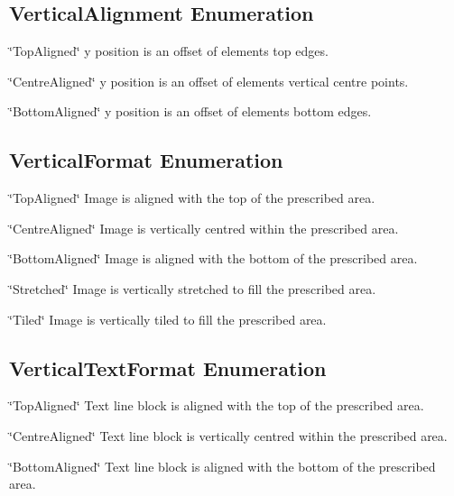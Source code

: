 \hypertarget{fal_enum_ref_fal_enum_ref_sec_9}{}\subsection{Vertical\+Alignment Enumeration}\label{fal_enum_ref_fal_enum_ref_sec_9}
\begin{DoxyItemize}
\item {\ttfamily \char`\"{}\+Top\+Aligned\char`\"{}} y position is an offset of element\textquotesingle{}s top edges. \item {\ttfamily \char`\"{}\+Centre\+Aligned\char`\"{}} y position is an offset of element\textquotesingle{}s vertical centre points. \item {\ttfamily \char`\"{}\+Bottom\+Aligned\char`\"{}} y position is an offset of element\textquotesingle{}s bottom edges.\end{DoxyItemize}
\hypertarget{fal_enum_ref_fal_enum_ref_sec_10}{}\subsection{Vertical\+Format Enumeration}\label{fal_enum_ref_fal_enum_ref_sec_10}
\begin{DoxyItemize}
\item {\ttfamily \char`\"{}\+Top\+Aligned\char`\"{}} Image is aligned with the top of the prescribed area. \item {\ttfamily \char`\"{}\+Centre\+Aligned\char`\"{}} Image is vertically centred within the prescribed area. \item {\ttfamily \char`\"{}\+Bottom\+Aligned\char`\"{}} Image is aligned with the bottom of the prescribed area. \item {\ttfamily \char`\"{}\+Stretched\char`\"{}} Image is vertically stretched to fill the prescribed area. \item {\ttfamily \char`\"{}\+Tiled\char`\"{}} Image is vertically tiled to fill the prescribed area.\end{DoxyItemize}
\hypertarget{fal_enum_ref_fal_enum_ref_sec_11}{}\subsection{Vertical\+Text\+Format Enumeration}\label{fal_enum_ref_fal_enum_ref_sec_11}
\begin{DoxyItemize}
\item {\ttfamily \char`\"{}\+Top\+Aligned\char`\"{}} Text line block is aligned with the top of the prescribed area. \item {\ttfamily \char`\"{}\+Centre\+Aligned\char`\"{}} Text line block is vertically centred within the prescribed area. \item {\ttfamily \char`\"{}\+Bottom\+Aligned\char`\"{}} Text line block is aligned with the bottom of the prescribed area.\end{DoxyItemize}
